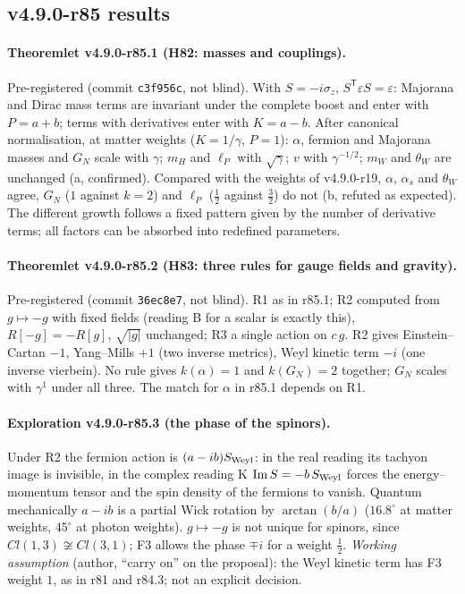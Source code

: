 \subsection*{v4.9.0-r85 results}
\label{subsec:v490-r85-results}

\paragraph{Theoremlet v4.9.0-r85.1 (H82: masses and couplings).}
Pre-registered (commit \texttt{c3f956c}, not blind).  With \(S=-i\sigma_z\), \(S^{\mathsf T}\varepsilon S=\varepsilon\): Majorana and Dirac mass terms are
invariant under the complete boost and enter with \(P=a+b\); terms with derivatives enter with \(K=a-b\).  After canonical normalisation, at
matter weights (\(K=1/\gamma\), \(P=1\)): \(\alpha\), fermion and Majorana masses and \(G_N\) scale with \(\gamma\); \(m_H\) and \(\ell_P\) with
\(\sqrt\gamma\); \(v\) with \(\gamma^{-1/2}\); \(m_W\) and \(\theta_W\) are unchanged (a, confirmed).  Compared with the weights of v4.9.0-r19, \(\alpha\),
\(\alpha_s\) and \(\theta_W\) agree, \(G_N\) (\(1\) against \(k=2\)) and \(\ell_P\) (\(\tfrac12\) against \(\tfrac32\)) do not (b, refuted as expected).  The
different growth follows a fixed pattern given by the number of derivative terms; all factors can be absorbed into redefined parameters.

\paragraph{Theoremlet v4.9.0-r85.2 (H83: three rules for gauge fields and gravity).}
Pre-registered (commit \texttt{36ec8e7}, not blind).  R1 as in r85.1; R2 computed from \(g\mapsto-g\) with fixed fields (reading B for a scalar
is exactly this), \(R[-g]=-R[g]\), \(\sqrt{|g|}\) unchanged; R3 a single action on \(c\,g\).  R2 gives Einstein--Cartan \(-1\), Yang--Mills \(+1\)
(two inverse metrics), Weyl kinetic term \(-i\) (one inverse vierbein).  No rule gives \(k(\alpha)=1\) and \(k(G_N)=2\) together; \(G_N\) scales
with \(\gamma^1\) under all three.  The match for \(\alpha\) in r85.1 depends on R1.

\paragraph{Exploration v4.9.0-r85.3 (the phase of the spinors).}
Under R2 the fermion action is \((a-ib)S_{\rm Weyl}\): in the real reading its tachyon image is invisible, in the complex reading K
\(\operatorname{Im}S=-b\,S_{\rm Weyl}\) forces the energy--momentum tensor and the spin density of the fermions to vanish.  Quantum mechanically
\(a-ib\) is a partial Wick rotation by \(\arctan(b/a)\) (\(16.8^\circ\) at matter weights, \(45^\circ\) at photon weights).  \(g\mapsto-g\) is not
unique for spinors, since \(Cl(1,3)\not\cong Cl(3,1)\); F3 allows the phase \(\mp i\) for a weight \(\tfrac12\).  \emph{Working assumption}
(author, ``carry on'' on the proposal): the Weyl kinetic term has F3 weight \(1\), as in r81 and r84.3; not an explicit decision.

